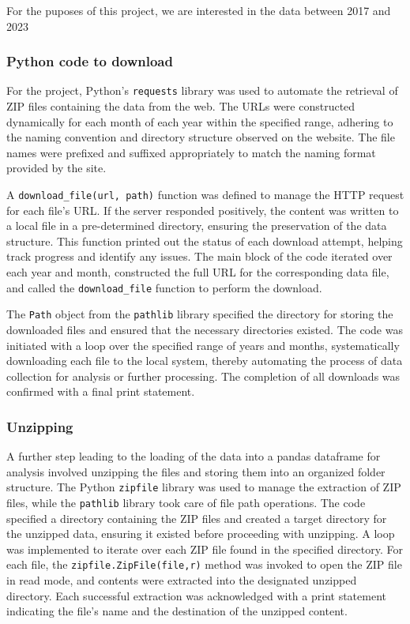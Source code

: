 \documentclass[mstat,12pt]{unswthesis}
\begin{document}
For the puposes of this project, we are interested in the data between
2017 and 2023

\subsubsection{Python code to download}\label{python-code-to-download}

For the project, Python's \texttt{requests} library was used to automate
the retrieval of ZIP files containing the data from the web. The URLs
were constructed dynamically for each month of each year within the
specified range, adhering to the naming convention and directory
structure observed on the website. The file names were prefixed and
suffixed appropriately to match the naming format provided by the site.

A \texttt{download\_file(url,\ path)} function was defined to manage the
HTTP request for each file's URL. If the server responded positively,
the content was written to a local file in a pre-determined directory,
ensuring the preservation of the data structure. This function printed
out the status of each download attempt, helping track progress and
identify any issues. The main block of the code iterated over each year
and month, constructed the full URL for the corresponding data file, and
called the \texttt{download\_file} function to perform the download.

The \texttt{Path} object from the \texttt{pathlib} library specified the
directory for storing the downloaded files and ensured that the
necessary directories existed. The code was initiated with a loop over
the specified range of years and months, systematically downloading each
file to the local system, thereby automating the process of data
collection for analysis or further processing. The completion of all
downloads was confirmed with a final print statement.

\subsubsection{Unzipping}\label{unzipping}

A further step leading to the loading of the data into a pandas
dataframe for analysis involved unzipping the files and storing them
into an organized folder structure. The Python \texttt{zipfile} library
was used to manage the extraction of ZIP files, while the
\texttt{pathlib} library took care of file path operations. The code
specified a directory containing the ZIP files and created a target
directory for the unzipped data, ensuring it existed before proceeding
with unzipping. A loop was implemented to iterate over each ZIP file
found in the specified directory. For each file, the
\texttt{zipfile.ZipFile(file,\textquotesingle{}r\textquotesingle{})}
method was invoked to open the ZIP file in read mode, and contents were
extracted into the designated unzipped directory. Each successful
extraction was acknowledged with a print statement indicating the file's
name and the destination of the unzipped content.
\end{document}
